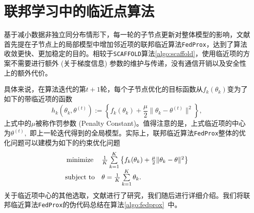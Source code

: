 \section{联邦学习中的临近点算法}
\label{sec:chap2-ppa}


基于减小数据非独立同分布情形下，每一轮的子节点更新对整体模型的影响，文献\parencite{sahu2018fedprox}首先提在子节点上的局部模型中增加邻近项的联邦临近算法\texttt{FedProx}，达到了算法收敛更快、更加稳定的目的。相较于\texttt{SCAFFOLD}算法\ref{algo:scaffold}，使用临近项的方案不需要进行额外 (关于梯度信息) 参数的维护与传递，没有通信开销以及安全性上的额外代价。

具体来说，在算法迭代的第$t+1$轮，每个子节点优化的目标函数从$f_k(\theta_k)$变为了如下的带临近项的函数
\begin{equation}
\label{eq:fedprox}
h_k(\theta_k, \theta^{(t)}) := \left\{ f_k(\theta_k) + \frac{\mu}{2} \lVert \theta_k - \theta^{(t)} \rVert^2  \right\},
\end{equation}
上式中的$\mu$被称作罚参数 (Penalty Constant)。值得注意的是，上式临近项的中心为$\theta^{(t)},$ 即上一轮迭代得到的全局模型。实际上，联邦临近算法\texttt{FedProx}整体的优化问题可以建模为如下的约束优化问题
\begin{equation}
\label{eq:fedprox-whole}
\begin{array}{cl}
\operatorname*{minimize} & \frac{1}{K} \sum\limits_{k=1}^K \left\{ f_k(\theta_k) + \frac{\mu}{2} \lVert \theta_k - \theta \rVert^2 \right\} \\
\text{subject to} & \theta = \frac{1}{K} \sum\limits_{k=1}^K \theta_k.
\end{array}
\end{equation}
关于临近项中心的其他选取，文献\parencite{hanzely2020federated,li_2021_ditto}进行了研究，我们随后进行详细介绍。我们将联邦临近算法\texttt{FedProx}的伪代码总结在算法\ref{algo:fedprox}~中。



